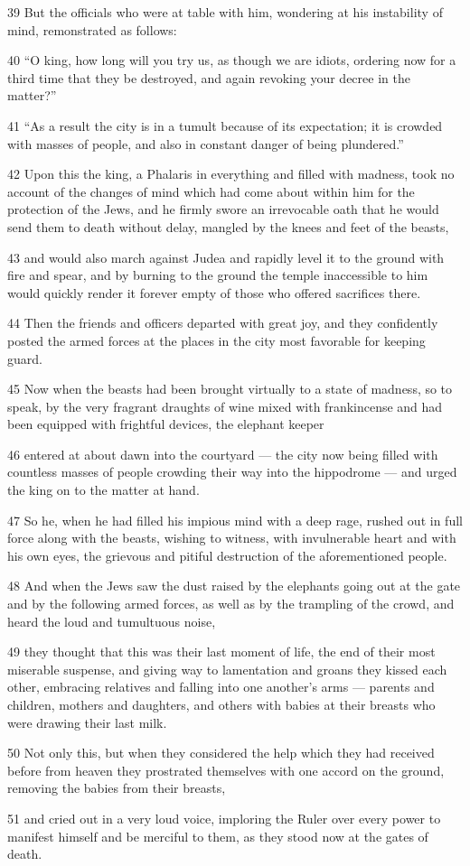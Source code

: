 \par 39 But the officials who were at table with him, wondering at his instability of mind, remonstrated as follows:
\par 40 “O king, how long will you try us, as though we are idiots, ordering now for a third time that they be destroyed, and again revoking your decree in the matter?”
\par 41 “As a result the city is in a tumult because of its expectation; it is crowded with masses of people, and also in constant danger of being plundered.”
\par 42 Upon this the king, a Phalaris in everything and filled with madness, took no account of the changes of mind which had come about within him for the protection of the Jews, and he firmly swore an irrevocable oath that he would send them to death without delay, mangled by the knees and feet of the beasts,
\par 43 and would also march against Judea and rapidly level it to the ground with fire and spear, and by burning to the ground the temple inaccessible to him would quickly render it forever empty of those who offered sacrifices there.
\par 44 Then the friends and officers departed with great joy, and they confidently posted the armed forces at the places in the city most favorable for keeping guard.
\par 45 Now when the beasts had been brought virtually to a state of madness, so to speak, by the very fragrant draughts of wine mixed with frankincense and had been equipped with frightful devices, the elephant keeper
\par 46 entered at about dawn into the courtyard — the city now being filled with countless masses of people crowding their way into the hippodrome — and urged the king on to the matter at hand.
\par 47 So he, when he had filled his impious mind with a deep rage, rushed out in full force along with the beasts, wishing to witness, with invulnerable heart and with his own eyes, the grievous and pitiful destruction of the aforementioned people.
\par 48 And when the Jews saw the dust raised by the elephants going out at the gate and by the following armed forces, as well as by the trampling of the crowd, and heard the loud and tumultuous noise,
\par 49 they thought that this was their last moment of life, the end of their most miserable suspense, and giving way to lamentation and groans they kissed each other, embracing relatives and falling into one another's arms — parents and children, mothers and daughters, and others with babies at their breasts who were drawing their last milk.
\par 50 Not only this, but when they considered the help which they had received before from heaven they prostrated themselves with one accord on the ground, removing the babies from their breasts,
\par 51 and cried out in a very loud voice, imploring the Ruler over every power to manifest himself and be merciful to them, as they stood now at the gates of death.

